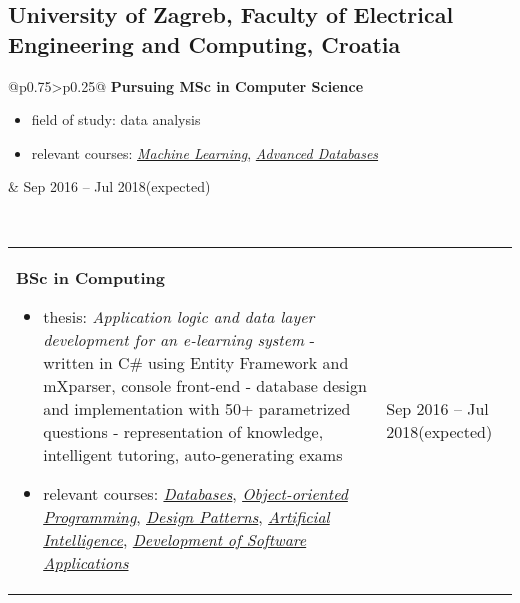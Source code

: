 \documentclass[a4paper]{article}
\makeatletter
\newlength{\tablewidth}
\newenvironment{period}[2]{%
\newcommand{\sarma}{#2}%
\setlength{\tablewidth}{\linewidth}
\addtolength{\tablewidth}{-2\tabcolsep}
\begin{tabular}{@{}p{0.75\tablewidth}>{\raggedleft\arraybackslash}p{0.25\tablewidth}@{}}%
#1 \newline
\begin{itemize}
}{%
\end{itemize} & \sarma \\%
\end{tabular}\\
}
\makeatother
\begin{document}
\subsection{University of Zagreb, Faculty of Electrical Engineering and Computing, Croatia}
\begin{period}{\textbf{Pursuing MSc in Computer Science}}{Sep 2016 -- Jul 2018\linebreak(expected)}
    \item field of study:
        data analysis
    \item relevant courses:
	    \textit{\href{%
	    	}{Machine Learning}},
	    \textit{\href{%
	    	}{Advanced Databases}}
\end{period}
\begin{period}{\textbf{BSc in Computing}}{Sep 2013 -- Jul 2016}
    \item thesis:
        \textit{Application logic and data layer development for an e-learning system}
        \newline - written in C\# using Entity Framework and mXparser, console front-end 
        \newline - database design and implementation with 50+ parametrized questions
        \newline - representation of knowledge, intelligent tutoring, auto-generating exams
        
    \item relevant courses:
	    \textit{\href{%
	    		}{Databases}},
		\textit{\href{%
				}{Object-oriented Programming}},
		\textit{\href{%
			}{Design Patterns}},
		\textit{\href{%
				}{Artificial Intelligence}},
		\textit{\href{%
				}{Development of Software Applications}}
		
\end{period}
\end{document}
